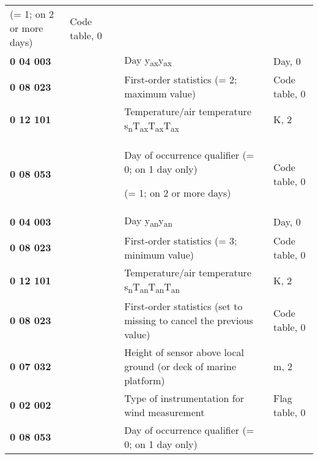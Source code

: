 \begin{longtable}[]{@{}lllll@{}}
\begin{minipage}[t]{0.17\columnwidth}
(= 1; on 2 or more days)\strut
\end{minipage} & \begin{minipage}[t]{0.17\columnwidth}\raggedright
Code table, 0\strut
\end{minipage}\tabularnewline
\textbf{0 04 003} & & & Day y\textsubscript{ax}y\textsubscript{ax} & Day, 0\tabularnewline
\textbf{0 08 023} & & & First-order statistics (= 2; maximum value) & Code table, 0\tabularnewline
\textbf{0 12 101} & & & Temperature/air temperature s\textsubscript{n}T\textsubscript{ax}T\textsubscript{ax}T\textsubscript{ax} & K, 2\tabularnewline
\begin{minipage}[t]{0.17\columnwidth}\raggedright
\textbf{0 08 053}\strut
\end{minipage} & \begin{minipage}[t]{0.17\columnwidth}\raggedright
\strut
\end{minipage} & \begin{minipage}[t]{0.17\columnwidth}\raggedright
\strut
\end{minipage} & \begin{minipage}[t]{0.17\columnwidth}\raggedright
Day of occurrence qualifier (= 0; on 1 day only)

(= 1; on 2 or more days)\strut
\end{minipage} & \begin{minipage}[t]{0.17\columnwidth}\raggedright
Code table, 0\strut
\end{minipage}\tabularnewline
\textbf{0 04 003} & & & Day y\textsubscript{an}y\textsubscript{an} & Day, 0\tabularnewline
\textbf{0 08 023} & & & First-order statistics (= 3; minimum value) & Code table, 0\tabularnewline
\textbf{0 12 101} & & & Temperature/air temperature s\textsubscript{n}T\textsubscript{an}T\textsubscript{an}T\textsubscript{an} & K, 2\tabularnewline
\textbf{0 08 023} & & & First-order statistics (set to missing to cancel the previous value) & Code table, 0\tabularnewline
\textbf{0 07 032} & & & Height of sensor above local ground (or deck of marine platform) & m, 2\tabularnewline
\textbf{0 02 002} & & & Type of instrumentation for wind measurement & Flag table, 0\tabularnewline
\begin{minipage}[t]{0.17\columnwidth}\raggedright
\textbf{0 08 053}\strut
\end{minipage} & \begin{minipage}[t]{0.17\columnwidth}\raggedright
\strut
\end{minipage} & \begin{minipage}[t]{0.17\columnwidth}\raggedright
\strut
\end{minipage} & \begin{minipage}[t]{0.17\columnwidth}\raggedright
Day of occurrence qualifier (= 0; on 1 day only)


\end{minipage}
\end{longtable}
